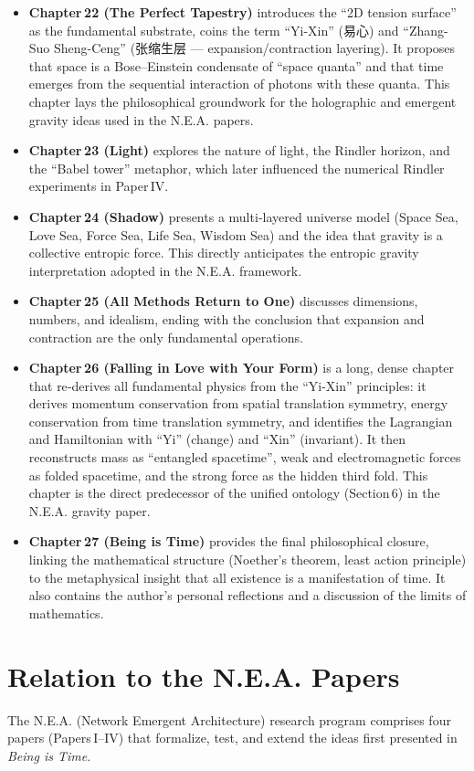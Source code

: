\documentclass[12pt,a4paper]{article}
\begin{document}
\begin{itemize}
    \item \textbf{Chapter 22 (The Perfect Tapestry)} introduces the “2D tension surface” as the fundamental substrate, coins the term “Yi-Xin” (易心) and “Zhang-Suo Sheng-Ceng” (张缩生层 — expansion/contraction layering). It proposes that space is a Bose–Einstein condensate of “space quanta” and that time emerges from the sequential interaction of photons with these quanta. This chapter lays the philosophical groundwork for the holographic and emergent gravity ideas used in the N.E.A. papers.
    \item \textbf{Chapter 23 (Light)} explores the nature of light, the Rindler horizon, and the “Babel tower” metaphor, which later influenced the numerical Rindler experiments in Paper IV.
    \item \textbf{Chapter 24 (Shadow)} presents a multi‑layered universe model (Space Sea, Love Sea, Force Sea, Life Sea, Wisdom Sea) and the idea that gravity is a collective entropic force. This directly anticipates the entropic gravity interpretation adopted in the N.E.A. framework.
    \item \textbf{Chapter 25 (All Methods Return to One)} discusses dimensions, numbers, and idealism, ending with the conclusion that expansion and contraction are the only fundamental operations.
    \item \textbf{Chapter 26 (Falling in Love with Your Form)} is a long, dense chapter that re‑derives all fundamental physics from the “Yi-Xin” principles: it derives momentum conservation from spatial translation symmetry, energy conservation from time translation symmetry, and identifies the Lagrangian and Hamiltonian with “Yi” (change) and “Xin” (invariant). It then reconstructs mass as “entangled spacetime”, weak and electromagnetic forces as folded spacetime, and the strong force as the hidden third fold. This chapter is the direct predecessor of the unified ontology (Section 6) in the N.E.A. gravity paper.
    \item \textbf{Chapter 27 (Being is Time)} provides the final philosophical closure, linking the mathematical structure (Noether’s theorem, least action principle) to the metaphysical insight that all existence is a manifestation of time. It also contains the author’s personal reflections and a discussion of the limits of mathematics.
\end{itemize}

\section*{Relation to the N.E.A. Papers}
The N.E.A. (Network Emergent Architecture) research program comprises four papers (Papers I–IV) that formalize, test, and extend the ideas first presented in \textit{Being is Time}. 
\end{document}
